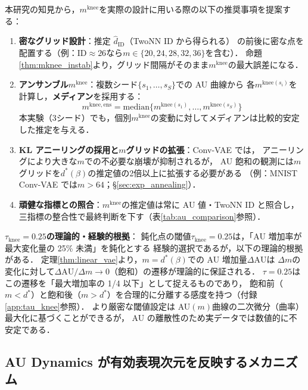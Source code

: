 \documentclass[11pt,a4paper]{jsarticle}
\newcommand{\mknee}{m^{\mathrm{knee}}}
\begin{document}
本研究の知見から，$\mknee$を実際の設計に用いる際の以下の推奨事項を提案する：
\begin{enumerate}
  \item \textbf{密なグリッド設計}：推定 $\hat{d}_\mathrm{ID}$（TwoNN ID から得られる）
        の前後に密な点を配置する（例：ID$\approx 26$なら$m \in \{20, 24, 28, 32, 36\}$を含む）．
        命題\ref{thm:mknee_instab}より，グリッド間隔がそのまま$\mknee$の最大誤差になる．
  \item \textbf{アンサンブル$\mknee$}：複数シード$\{s_1,\ldots,s_S\}$での AU 曲線から
        各$m^{\mathrm{knee}(s_i)}$を計算し，\textbf{メディアン}を採用する：
        \begin{equation}
          m^{\mathrm{knee,ens}} = \mathrm{median}\bigl\{m^{\mathrm{knee}(s_1)}, \ldots, m^{\mathrm{knee}(s_S)}\bigr\}
          \label{eq:mknee_ens}
        \end{equation}
        本実験（3シード）でも，個別$\mknee$の変動に対してメディアンは比較的安定した推定を与える．
  \item \textbf{KL アニーリングの採用と$m$グリッドの拡張}：Conv-VAE では，
        アニーリングにより大きな$m$での不必要な崩壊が抑制されるが，
        AU 飽和の観測には$m$グリッドを$d^*(\beta)$の推定値の2倍以上に拡張する必要がある
        （例：MNIST Conv-VAE では$m > 64$；§\ref{sec:exp_annealing}）．
  \item \textbf{頑健な指標との照合}：$\mknee$の推定値は常に AU 値・TwoNN ID と照合し，
        三指標の整合性で最終判断を下す（表\ref{tab:au_comparison}参照）．
\end{enumerate}

\textbf{$\tau_{\mathrm{knee}} = 0.25$の理論的・経験的根拠}：
鈍化点の閾値$\tau_{\mathrm{knee}} = 0.25$は，「AU 増加率が最大変化量の 25\% 未満」を鈍化とする
経験的選択であるが，以下の理論的根拠がある．
定理\ref{thm:linear_vae}より，$m = d^*(\beta)$での AU 増加量$\Delta\mathrm{AU}$は
$\Delta m$の変化に対して$\Delta\mathrm{AU}/\Delta m \to 0$（飽和）の遷移が理論的に保証される．
$\tau = 0.25$はこの遷移を「最大増加率の 1/4 以下」として捉えるものであり，
飽和前（$m < d^*$）と飽和後（$m > d^*$）を合理的に分離する感度を持つ（付録\ref{app:tau_knee}参照）．
より厳密な閾値設定は AU$(m)$曲線の二次微分（曲率）最大化に基づくことができるが，
AU の離散性のため実データでは数値的に不安定である．

\subsection{AU Dynamics が有効表現次元を反映するメカニズム}\label{sec:disc_au_dynamics}
\end{document}
